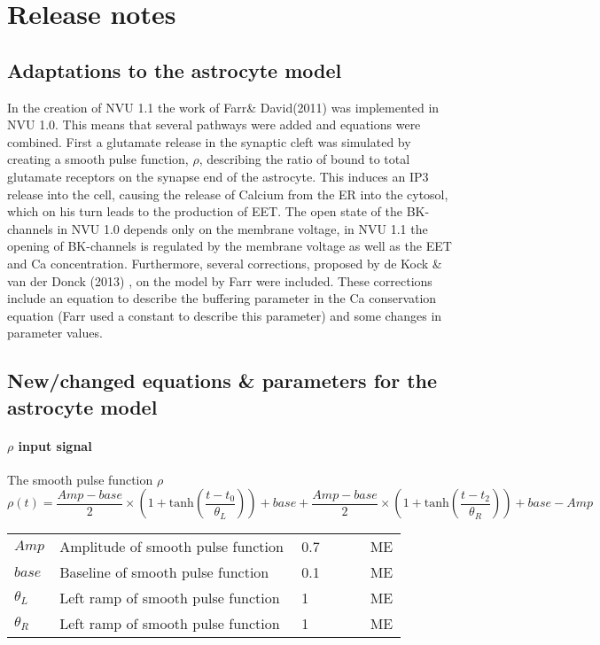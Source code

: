 \section{Release notes}

\subsection{Adaptations to the astrocyte model}
In the creation of NVU 1.1 the work of Farr\& David(2011) \cite{Farr2011} was implemented in NVU 1.0. This means that several pathways were added and equations were combined. First a glutamate release in the synaptic cleft was simulated by creating a smooth pulse function, $\rho$, describing the ratio of bound to total glutamate receptors on the synapse end of the astrocyte. This induces an \gls{IP3} release into the cell, causing the release of Calcium from the \gls{ER} into the cytosol, which on his turn leads to the production of EET. The open state of the BK-channels in NVU 1.0 depends only on the membrane voltage, in NVU 1.1 the opening of BK-channels is regulated by the membrane voltage as well as the EET and \gls{Ca} concentration. Furthermore, several corrections, proposed by de Kock \& van der Donck (2013) \cite{LoesEvert}, on the model by Farr were included. These corrections include an equation to describe the buffering parameter in the \gls{Ca} conservation equation (Farr \cite{Farr2011} used a constant to describe this parameter) and some changes in parameter values.

\subsection{New/changed equations \& parameters for the astrocyte model}
\paragraph{$\rho$ input signal}

The smooth pulse function $\rho$
\begin{equation}
\rho(t) = \frac{Amp - base}{2}\times\left(1+\mathrm{tanh}\left(\frac{t-t_0}{\theta_L}\right)\right)+base+\frac{Amp-base}{2}\times\left(1+\mathrm{tanh}\left(\frac{t-t_2}{\theta_R}\right)\right)+base-Amp     
\end{equation}
%
\begin{table}[h!]
	\centering
	\begin{tabular}{| p{0.09\linewidth} | >{\footnotesize} p{0.6\linewidth} | >{\footnotesize} p{0.17\linewidth} | >{\footnotesize} p{0.02\linewidth} |}
		\arrayrulecolor{lightgrey}\hline
		$Amp$           & Amplitude of smooth pulse function & 0.7 & ME\\
		$base$          & Baseline of smooth pulse function & 0.1 & ME\\
		$\theta_L$      & Left ramp of smooth pulse function & 1 & ME\\
		$\theta_R$      & Left ramp of smooth pulse function & 1 & ME\\
		\hline
	\end{tabular}
\end{table}

